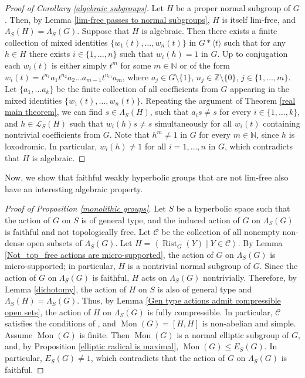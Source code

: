 \documentclass[11pt,letterpaper]{article}
\newcommand{\NN}{\mathbb{N}}
\newcommand{\ZZ}{\mathbb{Z}}
\DeclareMathOperator{\rist}{Rist}
\DeclareMathOperator{\Mon}{Mon}
\theoremstyle{definition}
\theoremstyle{remark}
\begin{document}
\begin{proof}[Proof of Corollary \ref{algebraic subgroups}]
Let $H$ be a proper normal subgroup of $G$. Then, by Lemma \ref{lim-free passes to normal subgroups}, $H$ is itself lim-free, and $\Lambda_S(H)=\Lambda_S(G)$. Suppose that $H$ is algebraic. Then there exists a finite collection of mixed identities $\{ w_1(t), \dots, w_n(t)\}$ in $G * \langle t \rangle$ such that for any $h \in H$ there exists $i \in \{1, \dots, n\}$ such that $w_i(h)=1$ in $G$. Up to conjugation each $w_i(t)$ is either simply $t^m$ for some $m \in \NN$ or of the form $w_i(t) = t^{n_1}a_1t^{n_2}a_2 \ldots a_{m-1}t^{n_m}a_m$, where $a_j \in G\setminus \{1\}$, $n_j \in \ZZ \setminus \{0\}$, $j \in \{1, \ldots, m\}$. Let $\{a_1, \dots a_k\}$ be the finite collection of all coefficients from $G$ appearing in the mixed identities $\{ w_1(t), \dots, w_n(t)\}$. Repeating the argument of Theorem \ref{real main theorem}, we can find $s \in \Lambda_S(H)$, such that $a_is \neq s$ for every $i \in \{1, \ldots, k\}$, and $h \in \mathcal{L}_S(H)$ such that $w_i(h)s \neq s$ simultaneously for all $w_i(t)$ containing nontrivial coefficients from $G$. Note that $h^m \neq 1$ in $G$ for every $m \in \NN$, since $h$ is loxodromic. In particular, $w_i(h) \neq 1$ for all $i=1, \dots, n$ in $G$, which contradicts that $H$ is algebraic.
\end{proof}

Now, we show that faithful weakly hyperbolic groups that are not lim-free also have an interesting algebraic property.

\begin{proof}[Proof of Proposition \ref{monolithic groups}] 
 Let $S$ be a hyperbolic space such that the action of $G$ on $S$ is of general type, and the induced action of $G$ on $\Lambda_S(G)$ is faithful and not topologically free. Let $\mathcal{C}$ be the collection of all nonempty non-dense open subsets of $\Lambda_S(G)$. Let $H=\left\langle \rist_G(Y) \mid Y \in \mathcal{C}\right\rangle$. By Lemma \ref{Not_top_free actions are micro-supported}, the action of $G$ on $\Lambda_S(G)$ is micro-supported; in particular, $H$ is a nontrivial normal subgroup of $G$. Since the action of $G$ on $\Lambda_S(G)$ is faithful, $H$ acts on $\Lambda_S(G)$ nontrivially. Therefore, by Lemma \ref{dichotomy}, the action of $H$ on $S$ is also of general type and $\Lambda_S(H) = \Lambda_S(G)$. Thus, by Lemma \ref{Gen type actions admit compressible open sets}, the action of $H$ on $\Lambda_S(G)$ is fully compressible. In particular, $\mathcal{C}$ satisfies the conditions of \cite[Corollary 1.7]{GR}, and $\Mon(G)=[H,H]$ is non-abelian and simple. Assume $\Mon(G)$ is finite. Then $\Mon(G)$ is a normal elliptic subgroup of $G$, and, by Proposition \ref{elliptic radical is maximal}, $\Mon(G) \leq E_S(G)$. In particular, $E_S(G) \neq 1$, which contradicts that the action of $G$ on $\Lambda_S(G)$ is faithful.
\end{proof}
\end{document}

